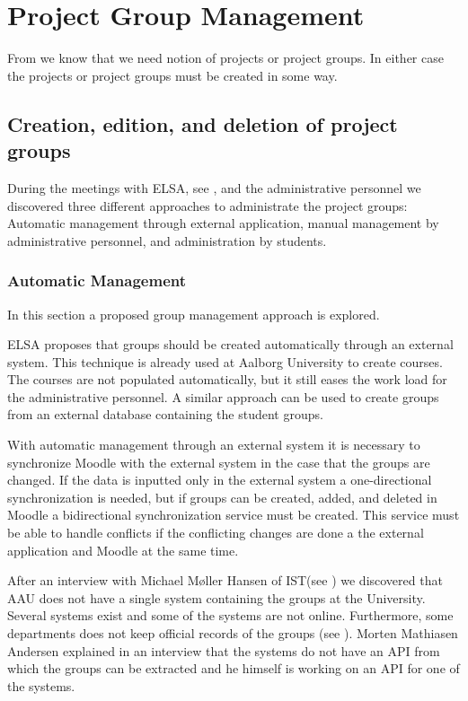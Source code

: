 \section{Project Group Management}
\label{sec:groupManagement}
From  we know that we need notion of projects or project groups. In either case the projects or project groups must be created in some way. 
\subsection{Creation, edition, and deletion of project groups} %
During the meetings with ELSA,  see , and the administrative personnel we discovered three different approaches to administrate the project groups: Automatic management through external application, manual management by administrative personnel, and administration by students. 


\subsubsection{Automatic Management}
In this section a proposed group management approach is explored.  

ELSA proposes that groups should be created automatically through an external system. 
This technique is already used at Aalborg University to create courses. 
The courses are not populated automatically, but it still eases the work load for the administrative personnel.  
A similar approach can be used to create groups from an external database containing the student groups. 

With automatic management through an external system it is necessary to synchronize Moodle with the external system in the case that the groups are changed. 
If the data is inputted only in the external system a one-directional synchronization is needed, but if groups can be created, added, and deleted in Moodle a bidirectional synchronization service must be created. 
This service must be able to handle conflicts if the conflicting changes are done a the external application and Moodle at the same time.

After an interview with Michael Møller Hansen of IST(see ) we discovered that AAU does not have a single system containing the groups at the University.
Several systems exist and some of the systems are not online.
Furthermore, some departments does not keep official records of the groups (see ).
Morten Mathiasen Andersen explained in an interview that the systems do not have an API from which the groups can be extracted and he himself is working on an API for one of the systems.

